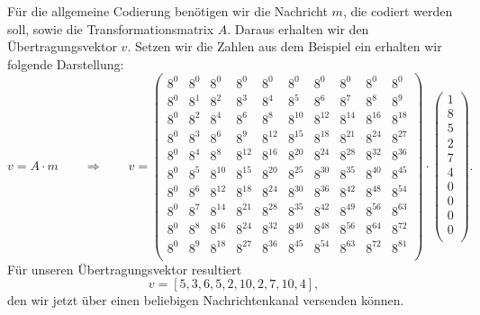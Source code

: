 Für die allgemeine Codierung benötigen wir die Nachricht $m$, die codiert werden soll, sowie die Transformationsmatrix $A$. Daraus erhalten wir den Übertragungsvektor $v$. Setzen wir die Zahlen aus dem Beispiel ein erhalten wir folgende Darstellung:
\[
v = A \cdot m \qquad \Rightarrow \qquad v = \begin{pmatrix}
	8^0&    8^0&    8^0&    8^0&    8^0&    8^0&    8^0&    8^0&    8^0&    8^0\\
	8^0&	8^1&	8^2&	8^3&	8^4&	8^5&	8^6&	8^7&    8^8&	8^9\\
	8^0&	8^2&	8^4&	8^6&	8^8& 8^{10}& 8^{12}& 8^{14}& 8^{16}& 8^{18}\\
	8^0&	8^3&	8^6&	8^9& 8^{12}& 8^{15}& 8^{18}& 8^{21}& 8^{24}& 8^{27}\\
	8^0&	8^4&	8^8& 8^{12}& 8^{16}& 8^{20}& 8^{24}& 8^{28}& 8^{32}& 8^{36}\\
	8^0&	8^5& 8^{10}& 8^{15}& 8^{20}& 8^{25}& 8^{30}& 8^{35}& 8^{40}& 8^{45}\\
	8^0&	8^6& 8^{12}& 8^{18}& 8^{24}& 8^{30}& 8^{36}& 8^{42}& 8^{48}& 8^{54}\\
	8^0&	8^7& 8^{14}& 8^{21}& 8^{28}& 8^{35}& 8^{42}& 8^{49}& 8^{56}& 8^{63}\\
	8^0&	8^8& 8^{16}& 8^{24}& 8^{32}& 8^{40}& 8^{48}& 8^{56}& 8^{64}& 8^{72}\\
	8^0&	8^9& 8^{18}& 8^{27}& 8^{36}& 8^{45}& 8^{54}& 8^{63}& 8^{72}& 8^{81}\\
\end{pmatrix}
\cdot
\begin{pmatrix}
	1 \\ 8 \\ 5 \\ 2 \\ 7 \\ 4 \\ 0 \\ 0 \\ 0 \\ 0 \\
\end{pmatrix}
.
\]
Für unseren Übertragungsvektor resultiert
\[
v = [5,3,6,5,2,10,2,7,10,4],
\]
den wir jetzt über einen beliebigen Nachrichtenkanal versenden können.
%
